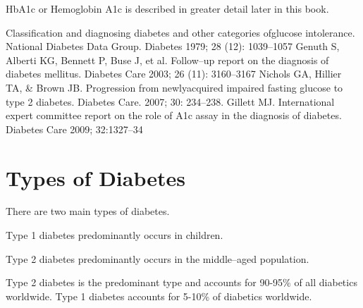 HbA1c or Hemoglobin A1c is described in greater detail later in this book.

\begin{thebibliography}{99}
 Classification and diagnosing diabetes and other categories of\break glucose intolerance. National Diabetes Data Group. Diabetes 1979; 28 (12): 1039–1057
  Genuth S, Alberti KG, Bennett P, Buse J, et al. Follow–up report on the diagnosis of diabetes mellitus. Diabetes Care 2003; 26 (11): 3160–3167
  Nichols GA, Hillier TA, \& Brown JB. Progression from newly\break acquired impaired fasting glucose to type 2 diabetes. Diabetes Care. 2007; 30: 234–238.
  Gillett MJ. International expert committee report on the role of A1c assay in the diagnosis of diabetes. Diabetes Care 2009; 32:1327–34
 \end{thebibliography}


\chapter{Types of Diabetes}\label{chap6}

There are two main types of diabetes.

Type 1 diabetes predominantly occurs in children.

Type 2 diabetes predominantly occurs in the middle–aged popu\-lation.

Type 2 diabetes is the predominant type and accounts for 90-95\% of all diabetics worldwide.  Type 1 diabetes accounts for 5-10\% of diabetics worldwide.

